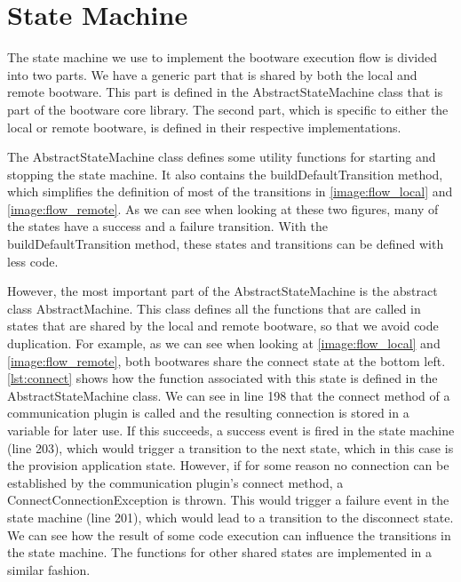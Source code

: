 \section{State Machine}
\label{implementation:statemachine}

The state machine we use to implement the bootware execution flow is divided into two parts.
We have a generic part that is shared by both the local and remote bootware.
This part is defined in the AbstractStateMachine class that is part of the bootware core library.
The second part, which is specific to either the local or remote bootware, is defined in their respective implementations.

The AbstractStateMachine class defines some utility functions for starting and stopping the state machine.
It also contains the buildDefaultTransition method, which simplifies the definition of most of the transitions in \autoref{image:flow_local} and \autoref{image:flow_remote}.
As we can see when looking at these two figures, many of the states have a success and a failure transition.
With the buildDefaultTransition method, these states and transitions can be defined with less code.

However, the most important part of the AbstractStateMachine is the abstract class AbstractMachine.
This class defines all the functions that are called in states that are shared by the local and remote bootware, so that we avoid code duplication.
For example, as we can see when looking at \autoref{image:flow_local} and \autoref{image:flow_remote}, both bootwares share the connect state at the bottom left.
\autoref{lst:connect} shows how the function associated with this state is defined in the AbstractStateMachine class.
We can see in line 198 that the connect method of a communication plugin is called and the resulting connection is stored in a variable for later use.
If this succeeds, a success event is fired in the state machine (line 203), which would trigger a transition to the next state, which in this case is the provision application state.
However, if for some reason no connection can be established by the communication plugin's connect method, a ConnectConnectionException is thrown.
This would trigger a failure event in the state machine (line 201), which would lead to a transition to the disconnect state.
We can see how the result of some code execution can influence the transitions in the state machine.
The functions for other shared states are implemented in a similar fashion.

\vspace*{\baselineskip}

